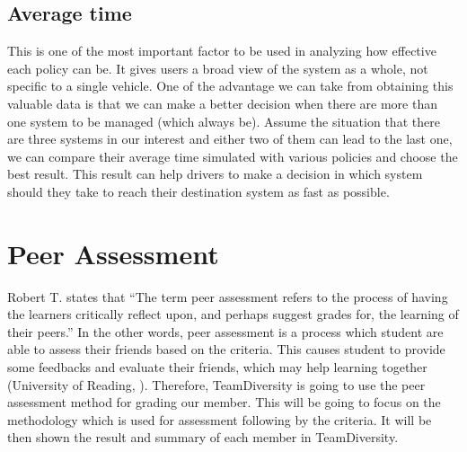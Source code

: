 \documentclass[11pt]{article}
\begin{document}
\subsection{Average time}
	 This is one of the most important factor to be used in analyzing how effective each policy can be. It gives users a broad view of the system as a whole, not specific to a single vehicle. One of the advantage we can take from obtaining this valuable data is that we can make a better decision when there are more than one system to be managed (which always be). Assume the situation that there are three systems in our interest and either two of them can lead to the last one, we can compare their average time simulated with various policies and choose the best result. This result can help drivers to make a decision in which system should they take to reach their destination system as fast as possible.
	 
\newpage	
\section{Peer Assessment}

Robert T. \cite{roberts2006self} states that “The term peer assessment refers to the process of having the learners critically reflect upon, and perhaps suggest grades for, the learning of their peers.” In the other words, peer assessment is a process which student are able to assess their friends based on the criteria. This causes student to provide some feedbacks and evaluate their friends, which may help learning together (University of Reading, \cite{peerAssessment}). Therefore, TeamDiversity is going to use the peer assessment method for grading our member. This will be going to focus on the methodology which is used for assessment following by the criteria. It will be then shown the result and summary of each member in TeamDiversity. 
\end{document}
